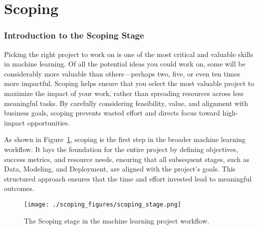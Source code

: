 \documentclass[12pt,openany]{book}
\begin{document}
\part{Scoping}

\section*{Introduction to the Scoping Stage}

Picking the right project to work on is one of the most critical and valuable skills in machine learning. Of all the potential ideas you could work on, some will be considerably more valuable than others—perhaps two, five, or even ten times more impactful. Scoping helps ensure that you select the most valuable project to maximize the impact of your work, rather than spreading resources across less meaningful tasks. By carefully considering feasibility, value, and alignment with business goals, scoping prevents wasted effort and directs focus toward high-impact opportunities. \newline

As shown in Figure~\ref{fig:scoping_stage}, scoping is the first step in the broader machine learning workflow. It lays the foundation for the entire project by defining objectives, success metrics, and resource needs, ensuring that all subsequent stages, such as Data, Modeling, and Deployment, are aligned with the project’s goals. This structured approach ensures that the time and effort invested lead to meaningful outcomes.


\begin{figure}[htbp]
    \centering
    \texttt{[image: ./scoping\_figures/scoping\_stage.png]}
    \caption{The Scoping stage in the machine learning project workflow.}
    \label{fig:scoping_stage}
\end{figure}
\end{document}
